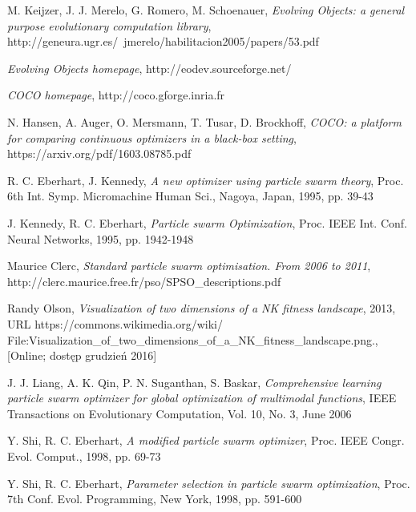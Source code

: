 \documentclass[12pt, twoside, openany, abstract=on]{report}
\theoremstyle{definition}
\begin{document}
\begin{thebibliography}{11}


 M. Keijzer, J. J. Merelo, G. Romero, M. Schoenauer, \emph{Evolving Objects: a general purpose evolutionary computation library}, http://geneura.ugr.es/~jmerelo/habilitacion2005/papers/53.pdf

 \emph{Evolving Objects homepage}, http://eodev.sourceforge.net/


 \emph{COCO homepage}, http://coco.gforge.inria.fr

 N. Hansen, A. Auger, O. Mersmann, T. Tusar, D. Brockhoff, \emph{COCO: a platform for comparing continuous optimizers in a black-box setting}, https://arxiv.org/pdf/1603.08785.pdf


 R. C. Eberhart, J. Kennedy, \emph{A new optimizer using particle swarm theory}, Proc. 6th Int. Symp. Micromachine Human Sci., Nagoya, Japan, 1995, pp. 39-43

 J. Kennedy, R. C. Eberhart, \emph{Particle swarm Optimization}, Proc. IEEE Int. Conf. Neural Networks, 1995, pp. 1942-1948

 Maurice Clerc, \emph{Standard particle swarm optimisation. From 2006 to 2011}, http://clerc.maurice.free.fr/pso/SPSO\_descriptions.pdf

 Randy Olson, \emph{Visualization of two dimensions of a NK fitness landscape}, 2013, URL https://commons.wikimedia.org/wiki/ \\ File:Visualization\_of\_two\_dimensions\_of\_a\_NK\_fitness\_landscape.png., [Online; dostęp grudzień 2016]


 J. J. Liang, A. K. Qin, P. N. Suganthan, S. Baskar, \emph{Comprehensive learning particle swarm optimizer for global optimization of multimodal functions}, IEEE Transactions on Evolutionary Computation, Vol. 10, No. 3, June 2006

 Y. Shi, R. C. Eberhart, \emph{A modified particle swarm optimizer}, Proc. IEEE Congr. Evol. Comput., 1998, pp. 69-73

 Y. Shi, R. C. Eberhart, \emph{Parameter selection in particle swarm optimization}, Proc. 7th Conf. Evol. Programming, New York, 1998, pp. 591-600


\end{thebibliography}
\end{document}
